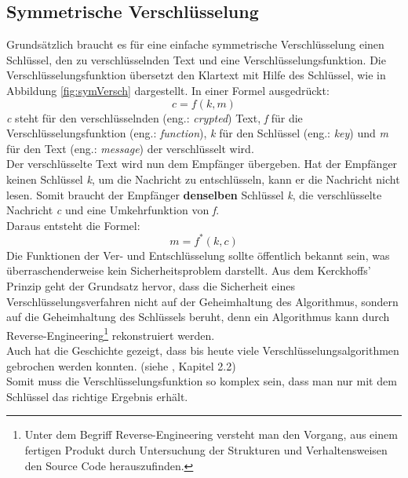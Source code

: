 \subsection{Symmetrische Verschlüsselung}
Grundsätzlich braucht es für eine einfache symmetrische Verschlüsselung einen Schlüssel, den zu verschlüsselnden Text und eine Verschlüsselungsfunktion.
Die Verschlüsselungs\-funktion übersetzt den Klartext mit Hilfe des Schlüssel, wie in Abbildung \ref{fig:symVersch} dargestellt. In einer Formel ausgedrückt:
\begin{equation*}
  c = f ( k, m )
\label{eqn:sym_versch}
\end{equation*}
\textit{c} steht für den verschlüsselnden  (eng.: \textit{crypted}) Text, \textit{f} für die Verschlüsselungsfunktion (eng.: \textit{function}), \textit{k} für den Schlüssel (eng.: \textit{key}) und \textit{m} für den Text (eng.: \textit{message}) der verschlüsselt wird.\\
%
Der verschlüsselte Text wird nun dem Empfänger übergeben. Hat der Empfänger keinen Schlüssel \textit{k}, um die Nachricht zu entschlüsseln, kann er die Nachricht nicht lesen. Somit braucht der Empfänger \textbf{denselben} Schlüssel \textit{k}, die verschlüsselte Nachricht \textit{c} und eine Umkehrfunktion von \textit{f}.\\
Daraus entsteht die Formel:
\begin{equation*}
  m = f^*(k ,c)
\label{eqn:sym_entsch}
\end{equation*}
Die Funktionen der Ver- und Entschlüsselung sollte öffentlich bekannt sein, was über\-raschender\-weise kein Sicherheitsproblem darstellt. Aus dem Kerckhoffs' Prinzip geht der Grundsatz hervor, dass die Sicherheit eines Verschlüsselungsverfahren nicht auf der Geheimhaltung des Algorithmus, sondern auf die Geheimhaltung des Schlüssels beruht, denn ein Algorithmus kann durch Reverse-Engineering\footnote{Unter dem Begriff Reverse-Engineering versteht man den Vorgang, aus einem fertigen Produkt durch Untersuchung der Strukturen und Verhaltensweisen den Source Code herauszufinden.} rekonstruiert werden.\\
Auch hat die Geschichte gezeigt, dass bis heute viele Verschlüsselungsalgorithmen gebrochen werden konnten. (siehe \cite{kryptographie}, Kapitel 2.2)\\
%
Somit muss die Verschlüsselungsfunktion so komplex sein, dass man nur mit dem Schlüssel das richtige Ergebnis erhält.
%
